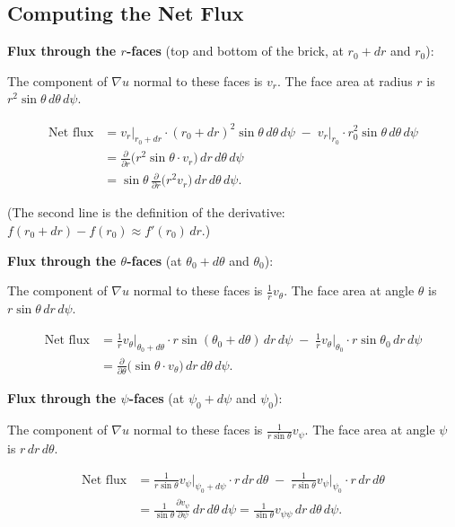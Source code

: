 \documentclass[11pt]{report}
\newcommand{\parti}[2]{\frac{\partial #1}{\partial #2}}
\begin{document}
\subsection{Computing the Net Flux}

\textbf{Flux through the $r$-faces} (top and bottom of the brick, at $r_0 + dr$ and $r_0$):

The component of $\nabla u$ normal to these faces is $v_r$. The face area at radius $r$ is $r^2\sin\theta \, d\theta \, d\psi$.

\begin{align*}
\text{Net flux} &= v_r\big|_{r_0 + dr} \cdot (r_0 + dr)^2 \sin\theta \, d\theta \, d\psi \;-\; v_r\big|_{r_0} \cdot r_0^2 \sin\theta \, d\theta \, d\psi \\
&= \parti{}{r}\big(r^2 \sin\theta \cdot v_r\big) \, dr \, d\theta \, d\psi \\
&= \sin\theta \, \parti{}{r}\big(r^2 v_r\big) \, dr \, d\theta \, d\psi.
\end{align*}

(The second line is the definition of the derivative: $f(r_0 + dr) - f(r_0) \approx f'(r_0) \, dr$.)

\textbf{Flux through the $\theta$-faces} (at $\theta_0 + d\theta$ and $\theta_0$):

The component of $\nabla u$ normal to these faces is $\frac{1}{r}v_\theta$. The face area at angle $\theta$ is $r\sin\theta \, dr \, d\psi$.

\begin{align*}
\text{Net flux} &= \frac{1}{r}v_\theta\big|_{\theta_0 + d\theta} \cdot r\sin(\theta_0 + d\theta) \, dr \, d\psi \;-\; \frac{1}{r}v_\theta\big|_{\theta_0} \cdot r\sin\theta_0 \, dr \, d\psi \\
&= \parti{}{\theta}\big(\sin\theta \cdot v_\theta\big) \, dr \, d\theta \, d\psi.
\end{align*}

\textbf{Flux through the $\psi$-faces} (at $\psi_0 + d\psi$ and $\psi_0$):

The component of $\nabla u$ normal to these faces is $\frac{1}{r\sin\theta}v_\psi$. The face area at angle $\psi$ is $r \, dr \, d\theta$.

\begin{align*}
\text{Net flux} &= \frac{1}{r\sin\theta}v_\psi\big|_{\psi_0 + d\psi} \cdot r \, dr \, d\theta \;-\; \frac{1}{r\sin\theta}v_\psi\big|_{\psi_0} \cdot r \, dr \, d\theta \\
&= \frac{1}{\sin\theta}\parti{v_\psi}{\psi} \, dr \, d\theta \, d\psi = \frac{1}{\sin\theta}v_{\psi\psi} \, dr \, d\theta \, d\psi.
\end{align*}
\end{document}
